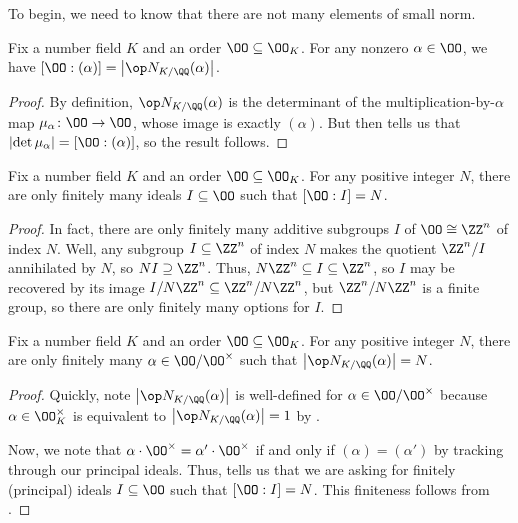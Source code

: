 \documentclass[../notes.tex]{subfiles}
\begin{document}
To begin, we need to know that there are not many elements of small norm.
\begin{lemma} \label{lem:element-norm-is-ideal-norm}
	Fix a number field $K$ and an order $\OO\subseteq\OO_K$. For any nonzero $\alpha\in\OO$, we have $[\OO:(\alpha)]=\left|\op N_{K/\QQ}(\alpha)\right|$.
\end{lemma}
\begin{proof}
	By definition, $\op N_{K/\QQ}(\alpha)$ is the determinant of the multiplication-by-$\alpha$ map $\mu_\alpha\colon\OO\to\OO$, whose image is exactly $(\alpha)$. But  then tells us that $\left|\det\mu_\alpha\right|=[\OO:(\alpha)]$, so the result follows.
\end{proof}
\begin{lemma} \label{lem:finite-ideals-of-index}
	Fix a number field $K$ and an order $\OO\subseteq\OO_K$. For any positive integer $N$, there are only finitely many ideals $I\subseteq\OO$ such that $[\OO:I]=N$.
\end{lemma}
\begin{proof}
	In fact, there are only finitely many additive subgroups $I$ of $\OO\cong\ZZ^n$ of index $N$. Well, any subgroup $I\subseteq\ZZ^n$ of index $N$ makes the quotient $\ZZ^n/I$ annihilated by $N$, so $NI\supseteq\ZZ^n$. Thus, $N\ZZ^n\subseteq I\subseteq\ZZ^n$, so $I$ may be recovered by its image $I/N\ZZ^n\subseteq\ZZ^n/N\ZZ^n$, but $\ZZ^n/N\ZZ^n$ is a finite group, so there are only finitely many options for $I$.
\end{proof}
\begin{proposition} \label{prop:finite-element-of-norm}
	Fix a number field $K$ and an order $\OO\subseteq\OO_K$. For any positive integer $N$, there are only finitely many $\alpha\in\OO/\OO^\times$ such that $\left|\op N_{K/\QQ}(\alpha)\right|=N$.
\end{proposition}
\begin{proof}
	Quickly, note $\left|\op N_{K/\QQ}(\alpha)\right|$ is well-defined for $\alpha\in\OO/\OO^\times$ because $\alpha\in\OO_K^\times$ is equivalent to $\left|\op N_{K/\QQ}(\alpha)\right|=1$ by .

	Now, we note that $\alpha\cdot\OO^\times=\alpha'\cdot\OO^\times$ if and only if $(\alpha)=(\alpha')$ by tracking through our principal ideals. Thus,  tells us that we are asking for finitely (principal) ideals $I\subseteq\OO$ such that $[\OO:I]=N$. This finiteness follows from .
\end{proof}
\end{document}
